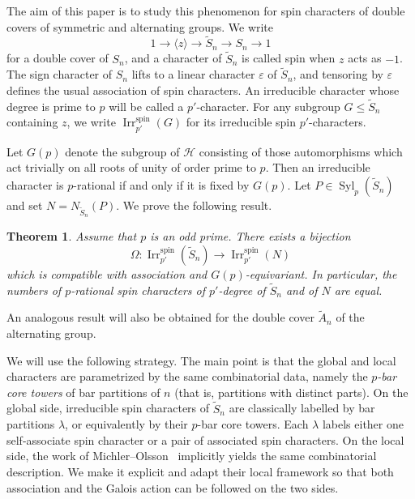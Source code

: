 \documentclass[reqno]{amsart}
\newtheorem{theorem}{Theorem}[section] %
\theoremstyle{definition}
\begin{document}
\medskip
The aim of this paper is to study this phenomenon for spin characters of
double covers of symmetric and alternating groups. We write
\[
1\longrightarrow\langle z\rangle
\longrightarrow\widetilde S_n
\longrightarrow S_n
\longrightarrow1
\]
for a double cover of $S_n$, and a character of $\widetilde S_n$ is
called spin when $z$ acts as $-1$. The sign character of $S_n$ lifts
to a linear character $\varepsilon$ of $\widetilde S_n$, and tensoring
by $\varepsilon$ defines the usual association of spin characters.
An irreducible character whose degree is prime to $p$ will be called a
$p'$-character.
For any subgroup $G\leq \widetilde S_n$ containing $z$, we write
$\operatorname{Irr}_{p'}^{\mathrm{spin}}(G)$ for its irreducible spin
$p'$-characters.
\smallskip 

Let $G(p)$ denote the subgroup of $\mathcal H$ consisting of those
automorphisms which act trivially on all roots of unity of order prime to
$p$. Then an irreducible character is $p$-rational if and only if it is
fixed by $G(p)$.
Let $P\in\operatorname{Syl}_p(\widetilde S_n)$ and set $N=N_{\widetilde
S_n}(P)$. We prove the following result.
\begin{theorem}
\label{thm:main} Assume that $p$ is an odd prime.
There exists a bijection
\[
\Omega:
\operatorname{Irr}_{p'}^{\mathrm{spin}}(\widetilde S_n)
\longrightarrow
\operatorname{Irr}_{p'}^{\mathrm{spin}}(N)
\]
which is compatible with association and $G(p)$-equivariant. In
particular, the numbers of $p$-rational spin characters of $p'$-degree of
$\widetilde S_n$ and of $N$ are equal.
\end{theorem}
An analogous result will also be obtained for the double cover $\widetilde
A_n$ of the alternating group.
\smallskip

We will use the following strategy. The main point is that the global and
local characters are parametrized by the same combinatorial data, namely
the \emph{$ p$-bar core towers} of bar partitions of $n$ (that
is, partitions with distinct parts). On the global side, irreducible spin
characters of  $\widetilde S_n$ are classically labelled by bar
partitions $\lambda$, or equivalently by their $ p$-bar core
towers.
Each $\lambda$ labels either one self-associate spin character or a pair
of associated spin characters. On the local side, the work of
Michler--Olsson~\cite{MichlerOlsson} implicitly yields the same
combinatorial description. We make it explicit and adapt their local
framework so that both association and the Galois action can be followed
on the two sides.
\end{document}
